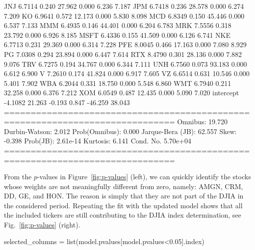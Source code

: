 \begin{solution}
\begin{ioutput}
JNJ            6.7114      0.240     27.962      0.000       6.236       7.187
JPM            6.7418      0.236     28.578      0.000       6.274       7.209
KO             6.9641      0.572     12.173      0.000       5.830       8.098
MCD            6.8349      0.150     45.446      0.000       6.537       7.133
MMM            6.4935      0.146     44.401      0.000       6.204       6.783
MRK            7.5556      0.318     23.792      0.000       6.926       8.185
MSFT           6.4336      0.155     41.509      0.000       6.126       6.741
NKE            6.7713      0.231     29.369      0.000       6.314       7.228
PFE            8.0045      0.466     17.163      0.000       7.080       8.929
PG             7.0308      0.294     23.894      0.000       6.447       7.614
RTX            8.4790      0.301     28.136      0.000       7.882       9.076
TRV            6.7275      0.194     34.767      0.000       6.344       7.111
UNH            6.7560      0.073     93.183      0.000       6.612       6.900
V              7.2610      0.174     41.824      0.000       6.917       7.605
VZ             6.6514      0.631     10.546      0.000       5.401       7.902
WBA            6.2044      0.331     18.750      0.000       5.548       6.860
WMT            6.7940      0.211     32.258      0.000       6.376       7.212
XOM            6.0549      0.487     12.435      0.000       5.090       7.020
intercept     -4.1082     21.263     -0.193      0.847     -46.259      38.043
==============================================================================
Omnibus:                       19.720   Durbin-Watson:                   2.012
Prob(Omnibus):                  0.000   Jarque-Bera (JB):               62.557
Skew:                          -0.398   Prob(JB):                     2.61e-14
Kurtosis:                       6.141   Cond. No.                     5.70e+04
==============================================================================
\end{ioutput}

From the $p$-values in Figure~\ref{fig:p-values} (left), we can quickly identify the stocks whose weights are not meaningfully different from zero, namely: AMGN, CRM, DD, GE, and HON. The reason is simply that they are not part of the DJIA in the considered period.
Repeating the fit with the updated model shows that all the included tickers are still contributing to the DJIA index determination, see Fig.~\ref{fig:p-values} (right).
	
\begin{ipython}
selected_columns = list(model.pvalues[model.pvalues<0.05].index)


\end{ipython}
\end{solution}
